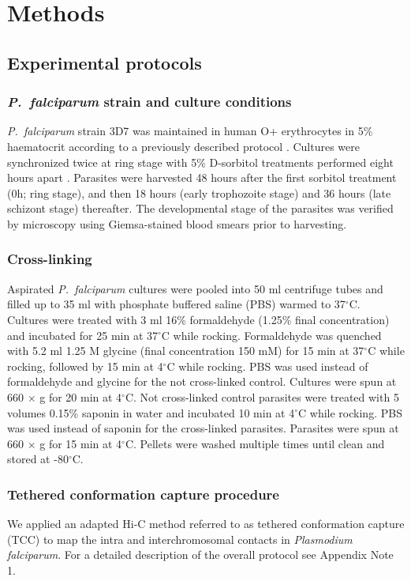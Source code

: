 \section{Methods}
\subsection{Experimental protocols}

\subsubsection{{\em P.\ falciparum} strain and culture conditions}
{\em P.\ falciparum} strain 3D7 was maintained in human O+ erythrocytes in
5\% haematocrit according to a previously described protocol \citep{trager:human}.
Cultures were synchronized twice at ring stage with 5\% D-sorbitol treatments
performed eight hours apart \citep{lambros:synchronization}. Parasites were
harvested 48 hours after the first sorbitol treatment (0h; ring stage), and
then 18 hours (early trophozoite stage) and 36 hours (late schizont stage)
thereafter. The developmental stage of the parasites was verified by microscopy
using Giemsa-stained blood smears prior to harvesting.

\subsubsection{Cross-linking}
Aspirated {\em P.\ falciparum} cultures were pooled into 50 ml centrifuge
tubes and filled up to 35 ml with phosphate buffered saline (PBS) warmed
to 37$^\circ$C. Cultures were treated with 3 ml 16\% formaldehyde
(1.25\% final concentration) and incubated for 25 min at 37$^\circ$C while rocking.
Formaldehyde was quenched with 5.2 ml 1.25 M glycine (final concentration 150 mM)
for 15 min at 37$^\circ$C while rocking, followed by 15 min at 4$^\circ$C while
rocking. PBS was used instead of formaldehyde and glycine for the not cross-linked
control. Cultures were spun at 660 $\times$ g for 20 min at 4$^\circ$C. Not
cross-linked control parasites were treated with 5 volumes 0.15\% saponin in water
and incubated 10 min at 4$^\circ$C while rocking. PBS was used instead of saponin
for the cross-linked parasites. Parasites were spun at 660 $\times$ g for 15 min
at 4$^\circ$C. Pellets were washed multiple times until clean and stored at -80$^\circ$C.

\subsubsection{Tethered conformation capture procedure}
We applied an adapted Hi-C method referred to as tethered conformation capture
(TCC) \citep{kalhor:genome} to map the intra and interchromosomal contacts in
{\em Plasmodium falciparum}. For a detailed description of the overall protocol
see Appendix Note 1.

